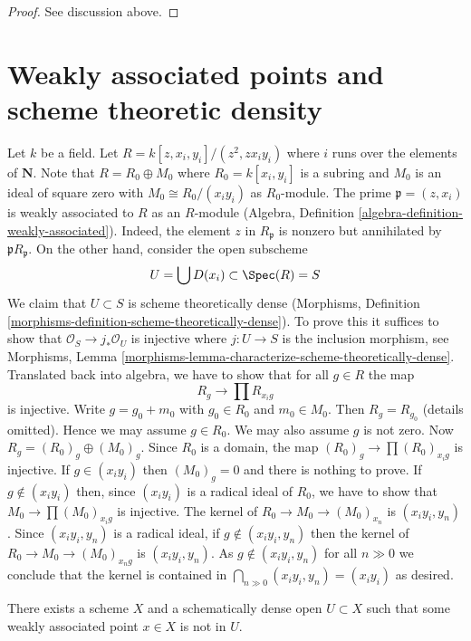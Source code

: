 \begin{proof}
See discussion above.
\end{proof}





\section{Weakly associated points and scheme theoretic density}
\label{section-weak-ass-dense}

\noindent
Let $k$ be a field. Let $R = k[z, x_i, y_i]/(z^2, zx_iy_i)$ where
$i$ runs over the elements of $\mathbf{N}$. Note that $R = R_0 \oplus M_0$ where
$R_0 = k[x_i, y_i]$ is a subring and $M_0$ is an ideal of square zero
with $M_0 \cong R_0/(x_iy_i)$ as $R_0$-module. The prime
$\mathfrak p = (z, x_i)$ is weakly associated to $R$ as an $R$-module
(Algebra, Definition \ref{algebra-definition-weakly-associated}).
Indeed, the element $z$ in $R_\mathfrak p$ is nonzero but annihilated
by $\mathfrak pR_\mathfrak p$. On the other hand, consider the open
subscheme
$$
U = \bigcup D(x_i) \subset \Spec(R) = S
$$
We claim that $U \subset S$ is scheme theoretically dense
(Morphisms, Definition \ref{morphisms-definition-scheme-theoretically-dense}).
To prove this it suffices to show that $\mathcal{O}_S \to j_*\mathcal{O}_U$
is injective where $j : U \to S$ is the inclusion morphism, see 
Morphisms, Lemma \ref{morphisms-lemma-characterize-scheme-theoretically-dense}.
Translated back into algebra, we have to show that for all $g \in R$
the map
$$
R_g \longrightarrow \prod R_{x_ig}
$$
is injective. Write $g = g_0 + m_0$ with $g_0 \in R_0$ and $m_0 \in M_0$.
Then $R_g = R_{g_0}$ (details omitted). Hence we may assume $g \in R_0$.
We may also assume $g$ is not zero. Now $R_g = (R_0)_g \oplus (M_0)_g$.
Since $R_0$ is a domain, the map $(R_0)_g \to \prod (R_0)_{x_ig}$ is
injective. If $g \in (x_iy_i)$ then $(M_0)_g = 0$ and there is nothing
to prove. If $g \not \in (x_iy_i)$ then, since
$(x_iy_i)$ is a radical ideal of $R_0$, we have to show that
$M_0 \to \prod (M_0)_{x_ig}$ is injective. The kernel of
$R_0 \to M_0 \to (M_0)_{x_n}$ is $(x_iy_i, y_n)$. Since
$(x_iy_i, y_n)$ is a radical ideal, if $g \not \in (x_iy_i, y_n)$
then the kernel of $R_0 \to M_0 \to (M_0)_{x_ng}$ is $(x_iy_i, y_n)$.
As $g \not \in (x_iy_i, y_n)$ for all $n \gg 0$ we conclude that
the kernel is contained in $\bigcap_{n \gg 0} (x_iy_i, y_n) = (x_iy_i)$
as desired.

\begin{lemma}
\label{lemma-example-schematically-dense-missing-weakly-associated-point}
There exists a scheme $X$ and a schematically dense open $U \subset X$
such that some weakly associated point $x \in X$ is not in $U$.
\end{lemma}

